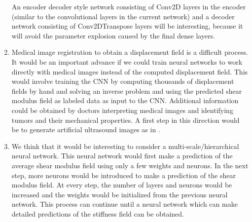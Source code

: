 \documentclass[12pt]{article}
\begin{document}
\begin{enumerate}
{  An encoder decoder style network consisting of Conv2D layers in the encoder (similar to the convolutional layers in the current network) and a decoder network consisting of Conv2DTranspose layers will be interesting, because it will avoid the parameter explosion caused by the final dense layers.
}
\item{Medical image registration to obtain a displacement field is a difficult process. It would be an important advance if we could train neural networks to work directly with medical images instead of the computed displacement field. This would involve training the CNN by computing thousands of displacement fields by hand and solving an inverse problem and using the predicted shear modulus field as labeled data as input to the CNN. Additional information could be obtained by doctors interpreting medical images and identifying tumors and their mechanical properties. A first step in this direction would be to generate artificial ultrasound images as in \cite{paper:doyley}.}
\item{We think that it would be interesting to consider a multi-scale/hierarchical neural network. This neural network would first make a prediction of the average shear modulus field using only a few weights and neurons. In the next step, more neurons would be introduced to make a prediction of the shear modulus field. At every step, the number of layers and neurons would be increased and the weights would be initialized from the previous neural network. This process can continue until a neural network which can make detailed predictions of the stiffness field can be obtained.}

\end{enumerate}
\end{document}
